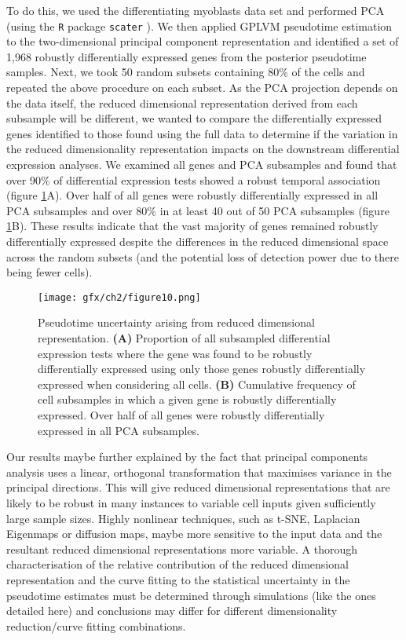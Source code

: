 To do this, we used the differentiating myoblasts data set \cite{Trapnell2014-xi} and performed PCA (using the \texttt{R} package \texttt{scater} \cite{McCarthy2017-we}). We then applied GPLVM pseudotime estimation to the two-dimensional principal component representation and identified a set of 1,968 robustly differentially expressed genes from the posterior pseudotime samples. Next, we took 50 random subsets containing 80\% of the cells and repeated the above procedure on each subset. As the PCA projection depends on the data itself, the reduced dimensional representation derived from each subsample will be different, we wanted to compare the differentially expressed genes identified to those found using the full data to determine if the variation in the reduced dimensionality representation impacts on the downstream differential expression analyses. We examined all genes and PCA subsamples and found that over 90\% of differential expression tests showed a robust temporal association (figure \ref{fig:pca_compare}A). Over half of all genes were robustly differentially expressed in all PCA subsamples and over 80\% in at least 40 out of 50 PCA subsamples (figure \ref{fig:pca_compare}B). These results indicate that the vast majority of genes remained robustly differentially expressed despite the differences in the reduced dimensional space across the random subsets (and the potential loss of detection power due to there being fewer cells).

\begin{figure}
\centering
	\texttt{[image: gfx/ch2/figure10.png]}
\caption{ Pseudotime uncertainty arising from reduced dimensional representation.
\textbf{(A)} Proportion of all subsampled differential expression tests where the gene was found to be robustly differentially expressed using only those genes robustly differentially expressed when considering all cells. %
\textbf{(B)} Cumulative frequency of cell subsamples in which a given gene is robustly differentially expressed. Over half of all genes were robustly differentially expressed in all PCA subsamples.} \label{fig:pca_compare}
\end{figure}

Our results maybe further explained by the fact that principal components analysis uses a linear, orthogonal transformation that maximises variance in the principal directions. This will give reduced dimensional representations that are likely to be robust in many instances to variable cell inputs given sufficiently large sample sizes. Highly nonlinear techniques, such as t-SNE, Laplacian Eigenmaps or diffusion maps, maybe more sensitive to the input data and the resultant reduced dimensional representations more variable. A thorough characterisation of the relative contribution of the reduced dimensional representation and the curve fitting to the statistical uncertainty in the pseudotime estimates must be determined through simulations (like the ones detailed here) and conclusions may differ for different dimensionality reduction/curve fitting combinations.

